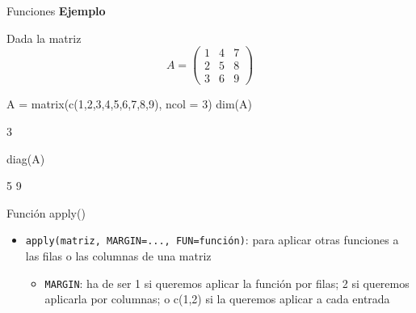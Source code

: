 \documentclass[
  ignorenonframetext,
  aspectratio=169]{beamer}
\newenvironment{Shaded}{\begin{snugshade}}{\end{snugshade}}
\newcommand{\AttributeTok}[1]{\textcolor[rgb]{0.77,0.63,0.00}{#1}}
\newcommand{\DecValTok}[1]{\textcolor[rgb]{0.00,0.00,0.81}{#1}}
\newcommand{\FunctionTok}[1]{\textcolor[rgb]{0.00,0.00,0.00}{#1}}
\newcommand{\NormalTok}[1]{#1}
\newcommand{\OtherTok}[1]{\textcolor[rgb]{0.56,0.35,0.01}{#1}}
\providecommand{\tightlist}{%
  \setlength{\itemsep}{0pt}\setlength{\parskip}{0pt}}
\let\oldverbatim\verbatim
\let\endoldverbatim\endverbatim
\renewenvironment{verbatim}{\tiny\oldverbatim}{\endoldverbatim}
\begin{document}
\begin{frame}[fragile]{Funciones}
\protect\hypertarget{funciones-2}{}
\textbf{Ejemplo}

Dada la matriz \[A = \begin{pmatrix}
1 & 4 & 7\\
2 & 5 & 8\\
3 & 6 & 9
\end{pmatrix}\]

\begin{Shaded}
\begin{Highlighting}[]
\NormalTok{A }\OtherTok{=} \FunctionTok{matrix}\NormalTok{(}\FunctionTok{c}\NormalTok{(}\DecValTok{1}\NormalTok{,}\DecValTok{2}\NormalTok{,}\DecValTok{3}\NormalTok{,}\DecValTok{4}\NormalTok{,}\DecValTok{5}\NormalTok{,}\DecValTok{6}\NormalTok{,}\DecValTok{7}\NormalTok{,}\DecValTok{8}\NormalTok{,}\DecValTok{9}\NormalTok{), }\AttributeTok{ncol =} \DecValTok{3}\NormalTok{)}
\FunctionTok{dim}\NormalTok{(A)}
\end{Highlighting}
\end{Shaded}

\begin{verbatim}
[1] 3 3
\end{verbatim}

\begin{Shaded}
\begin{Highlighting}[]
\FunctionTok{diag}\NormalTok{(A)}
\end{Highlighting}
\end{Shaded}

\begin{verbatim}
[1] 1 5 9
\end{verbatim}
\end{frame}

\begin{frame}[fragile]{Función apply()}
\protect\hypertarget{funciuxf3n-apply}{}
\begin{itemize}
\tightlist
\item
  \texttt{apply(matriz,\ MARGIN=...,\ FUN=función)}: para aplicar otras
  funciones a las filas o las columnas de una matriz

  \begin{itemize}
  \tightlist
  \item
    \texttt{MARGIN}: ha de ser 1 si queremos aplicar la función por
    filas; 2 si queremos aplicarla por columnas; o c(1,2) si la queremos
    aplicar a cada entrada
  \end{itemize}
\end{itemize}
\end{frame}
\end{document}

